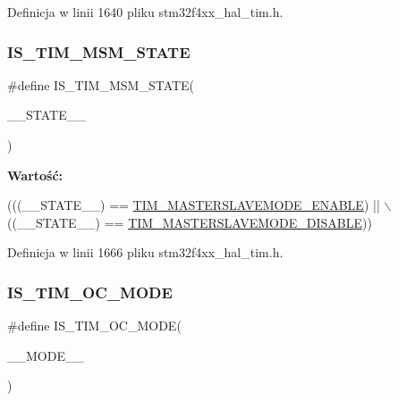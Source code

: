Definicja w linii 1640 pliku stm32f4xx\+\_\+hal\+\_\+tim.\+h.

\mbox{\label{group___t_i_m___private___macros_gafac5c2fba615264d7a1de6f85cfccc9a}} 
\subsubsection{\texorpdfstring{I\+S\+\_\+\+T\+I\+M\+\_\+\+M\+S\+M\+\_\+\+S\+T\+A\+TE}{IS\_TIM\_MSM\_STATE}}
{\footnotesize\ttfamily \#define I\+S\+\_\+\+T\+I\+M\+\_\+\+M\+S\+M\+\_\+\+S\+T\+A\+TE(\begin{DoxyParamCaption}\item[{}]{\+\_\+\+\_\+\+S\+T\+A\+T\+E\+\_\+\+\_\+ }\end{DoxyParamCaption})}

{\bfseries Wartość\+:}
\begin{DoxyCode}
(((\_\_STATE\_\_) == \hyperlink{group___t_i_m___master___slave___mode_gafdc0de07db4688aa8c87cf03220aaf28}{TIM\_MASTERSLAVEMODE\_ENABLE}) || \(\backslash\)
                                          ((\_\_STATE\_\_) == 
      \hyperlink{group___t_i_m___master___slave___mode_ga58ff99ef1d6d6f187e3615f9d3ec3b8b}{TIM\_MASTERSLAVEMODE\_DISABLE}))
\end{DoxyCode}


Definicja w linii 1666 pliku stm32f4xx\+\_\+hal\+\_\+tim.\+h.

\mbox{\label{group___t_i_m___private___macros_gac6968ae64781c2bda9f8714fe45917d0}} 
\subsubsection{\texorpdfstring{I\+S\+\_\+\+T\+I\+M\+\_\+\+O\+C\+\_\+\+M\+O\+DE}{IS\_TIM\_OC\_MODE}}
{\footnotesize\ttfamily \#define I\+S\+\_\+\+T\+I\+M\+\_\+\+O\+C\+\_\+\+M\+O\+DE(\begin{DoxyParamCaption}\item[{}]{\+\_\+\+\_\+\+M\+O\+D\+E\+\_\+\+\_\+ }\end{DoxyParamCaption})}

